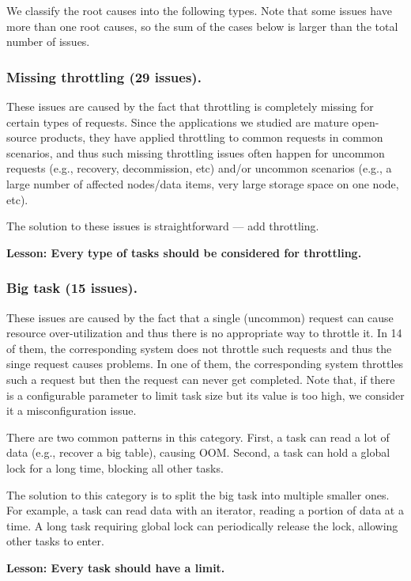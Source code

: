 We classify the root causes into the following types. Note that some issues have more than
one root causes, so the sum of the cases below is larger than the total number of issues.

\subsubsection{Missing throttling (29 issues).} These issues are caused by the fact that throttling
is completely missing for certain types of requests. Since the applications we studied are mature
open-source products, they have applied throttling to common requests in common scenarios, and thus
such missing throttling issues often happen for uncommon requests (e.g., recovery, decommission, etc)
and/or uncommon scenarios (e.g., a large number of affected nodes/data items, very large storage space on one node, etc).

The solution to these issues is straightforward --- add throttling.

\noindent
\textbf{Lesson: Every type of tasks should be considered for throttling.}

\subsubsection{Big task (15 issues).} These issues are caused by the fact that a single (uncommon) request
can cause resource over-utilization and thus there is no appropriate way to throttle it. In 14 of them,
the corresponding system does not throttle such requests and thus the singe request causes problems. In one
of them, the corresponding system throttles such a request but then the request can never get completed.
Note that, if there is a configurable parameter to limit task size but its value is too high, we consider it a
misconfiguration issue.

There are two common patterns in this category. First, a task can read a lot of data (e.g., recover a big
table), causing OOM. Second, a task can hold a global lock for a long time, blocking all other tasks.

The solution to this category is to split the big task into multiple smaller ones. For example, a task can
read data with an iterator, reading a portion of data at a time. A long task requiring global lock can
periodically release the lock, allowing other tasks to enter.

\noindent
\textbf{Lesson: Every task should have a limit.}

